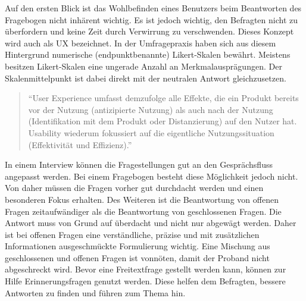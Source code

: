 Auf den ersten Blick ist das Wohlbefinden eines Benutzers beim Beantworten des Fragebogen nicht inhärent wichtig. 
Es ist jedoch wichtig, den Befragten nicht zu überfordern und keine Zeit durch Verwirrung zu verschwenden. 
Dieses Konzept wird auch als \acf*{UX} bezeichnet.
In der Umfragepraxis haben sich aus diesem Hintergrund numerische (endpunktbenannte) Likert-Skalen bewährt.\autocite[Vgl.][]{Likert} %
Meistens besitzen Likert-Skalen eine ungerade Anzahl an Merkmalausprägungen.
Der Skalenmittelpunkt ist dabei direkt mit der neutralen Antwort gleichzusetzen.\autocite[Vgl.][]{ISO}\label{Likert} 

\begin{quote}
	\enquote{User Experience umfasst demzufolge alle Effekte, die ein Produkt bereits vor der Nutzung (antizipierte Nutzung) als auch nach der Nutzung (Identifikation mit dem Produkt oder Distanzierung) auf den Nutzer hat. Usability wiederum fokussiert auf die eigentliche Nutzungssituation (Effektivität und Effizienz).}\autocite[Siehe][]{User}%
\end{quote}

In einem Interview können die Fragestellungen gut an den Gesprächsfluss angepasst werden.
Bei einem Fragebogen besteht diese Möglichkeit jedoch nicht.
Von daher müssen die Fragen vorher gut durchdacht werden und einen besonderen Fokus erhalten.
Des Weiteren ist die Beantwortung von offenen Fragen zeitaufwändiger als die Beantwortung von geschlossenen Fragen. %
Die Antwort muss von Grund auf überdacht und nicht nur abgewägt werden. 
Daher ist bei offenen Fragen eine verständliche, präzise und mit zusätzlichen Informationen ausgeschmückte Formulierung wichtig. 
Eine Mischung aus geschlossenen und offenen Fragen ist vonnöten, damit der Proband nicht abgeschreckt wird.
Bevor eine Freitextfrage gestellt werden kann, können zur Hilfe Erinnerungsfragen genutzt werden.
Diese helfen dem Befragten, bessere Antworten zu finden und führen zum Thema hin.\autocite[Vgl.][S. 35]{2009Fragebogen}%
